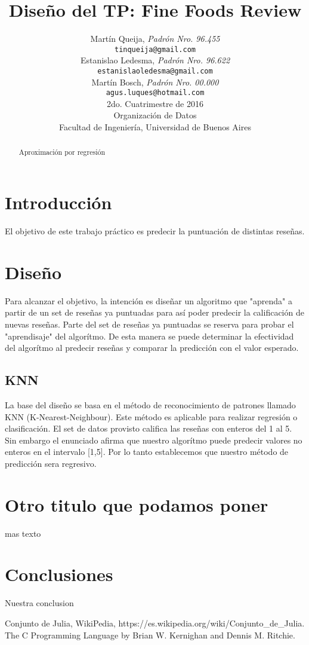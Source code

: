 \documentclass[a4paper,10pt]{article}
\title{		\textbf{Diseño del TP: Fine Foods Review}}
\author{	Martín Queija, \textit{Padrón Nro. 96.455}                     \\
            \texttt{ tinqueija@gmail.com }                                              \\[2.5ex]
            Estanislao Ledesma, \textit{Padrón Nro. 96.622}                     \\
            \texttt{ estanislaoledesma@gmail.com }                                              \\[2.5ex]
            Martín Bosch, \textit{Padrón Nro. 00.000}                     \\
            \texttt{ agus.luques@hotmail.com }                                              \\[2.5ex]
            \normalsize{2do. Cuatrimestre de 2016}                                      \\
            \normalsize{Organización de Datos  }  \\
            \normalsize{Facultad de Ingeniería, Universidad de Buenos Aires}            \\
       }
\date{}
\begin{document}
\maketitle
\thispagestyle{empty}   %


\begin{abstract}
\centerline{Aproximación por regresión}

\end{abstract}
\newpage

\tableofcontents


\section{Introducción}

El objetivo de este trabajo práctico es predecir la puntuación de distintas reseñas.

\section{Diseño}

Para alcanzar el objetivo, la intención es diseñar un algoritmo que "aprenda" a partir de un set de reseñas ya puntuadas para así poder predecir la calificación de nuevas reseñas. Parte del set de reseñas ya puntuadas se reserva para probar el "aprendisaje" del algorítmo. De esta manera se puede determinar la efectividad del algorítmo al predecir reseñas y comparar la predicción con el valor esperado.


\subsection{KNN}
La base del diseño se basa en el método de reconocimiento de patrones llamado KNN (K-Nearest-Neighbour). Este método es aplicable para realizar regresión o clasificación. El set de datos provisto califica las reseñas con enteros del 1 al 5. Sin embargo el enunciado afirma que nuestro algorítmo puede predecir valores no enteros en el intervalo [1,5]. Por lo tanto establecemos que nuestro método de predicción sera regresivo.

\section{Otro titulo que podamos poner}

mas texto

\section{Conclusiones}

Nuestra conclusion

\begin{thebibliography}{99}

 Conjunto de Julia, WikiPedia, https://es.wikipedia.org/wiki/Conjunto\_de\_Julia.
 The C Programming Language by Brian W. Kernighan and Dennis M. Ritchie.

\end{thebibliography}
\end{document}

